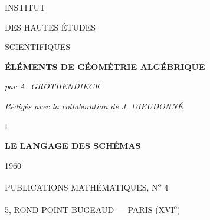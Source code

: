 \begin{titlepage}
\centering

{\Large INSTITUT\par}
\vspace{0.4em}
{\Large DES HAUTES ÉTUDES\par}
\vspace{0.4em}
{\Large SCIENTIFIQUES\par}

\vfill

{\Large\bfseries ÉLÉMENTS DE GÉOMÉTRIE ALGÉBRIQUE\par}
\vspace{1.5em}
{\large\itshape par A. GROTHENDIECK\par}
\vspace{0.7em}
{\itshape Rédigés avec la collaboration de J. DIEUDONNÉ\par}

\vspace{2em}
I

\vspace{1.5em}
{\Large\bfseries LE LANGAGE DES SCHÉMAS\par}

\vfill
{\Large 1960\par}
\vspace{1.2em}
{\Large PUBLICATIONS MATHÉMATIQUES, N\textsuperscript{o} 4\par}
\vspace{0.5em}
{\large 5, ROND-POINT BUGEAUD --- PARIS (XVI\textsuperscript{e})\par}
\end{titlepage}

\thispagestyle{empty}
\vspace*{\fill}
\begin{center}
\end{center}
\vspace*{\fill}
\clearpage
